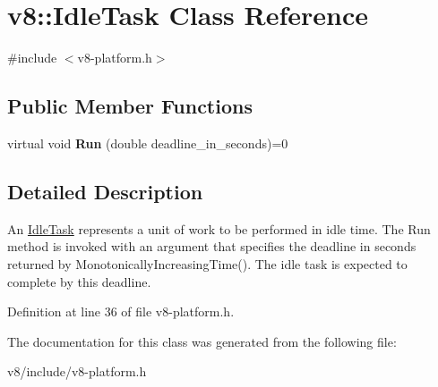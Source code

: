 \hypertarget{classv8_1_1IdleTask}{}\section{v8\+:\+:Idle\+Task Class Reference}
\label{classv8_1_1IdleTask}


{\ttfamily \#include $<$v8-\/platform.\+h$>$}

\subsection*{Public Member Functions}
\begin{DoxyCompactItemize}
\item 
\mbox{\label{classv8_1_1IdleTask_a4f2f238f551b3b2212adffcd5ee2f314}} 
virtual void {\bfseries Run} (double deadline\+\_\+in\+\_\+seconds)=0
\end{DoxyCompactItemize}


\subsection{Detailed Description}
An \mbox{\hyperlink{classv8_1_1IdleTask}{Idle\+Task}} represents a unit of work to be performed in idle time. The Run method is invoked with an argument that specifies the deadline in seconds returned by Monotonically\+Increasing\+Time(). The idle task is expected to complete by this deadline. 

Definition at line 36 of file v8-\/platform.\+h.



The documentation for this class was generated from the following file\+:\begin{DoxyCompactItemize}
\item 
v8/include/v8-\/platform.\+h\end{DoxyCompactItemize}
